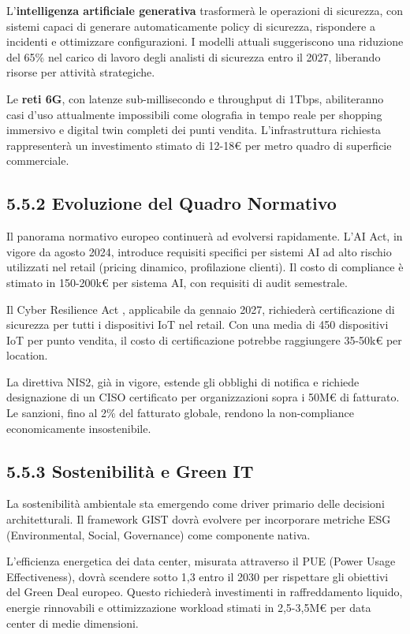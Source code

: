 L'\textbf{intelligenza artificiale generativa} trasformerà le operazioni di sicurezza, con sistemi capaci di generare automaticamente policy di sicurezza, rispondere a incidenti e ottimizzare configurazioni. I modelli attuali suggeriscono una riduzione del 65\% nel carico di lavoro degli analisti di sicurezza entro il 2027, liberando risorse per attività strategiche.

Le \textbf{reti 6G}, con latenze sub-millisecondo e throughput di 1Tbps, abiliteranno casi d'uso attualmente impossibili come olografia in tempo reale per shopping immersivo e digital twin completi dei punti vendita. L'infrastruttura richiesta rappresenterà un investimento stimato di 12-18€ per metro quadro di superficie commerciale.

\subsection{5.5.2 Evoluzione del Quadro Normativo}

Il panorama normativo europeo continuerà ad evolversi rapidamente. L'AI Act, in vigore da agosto 2024, introduce requisiti specifici per sistemi AI ad alto rischio utilizzati nel retail (pricing dinamico, profilazione clienti). Il costo di compliance è stimato in 150-200k€ per sistema AI, con requisiti di audit semestrale.

Il Cyber Resilience Act \autocite{ec2024digital}, applicabile da gennaio 2027, richiederà certificazione di sicurezza per tutti i dispositivi IoT nel retail. Con una media di 450 dispositivi IoT per punto vendita, il costo di certificazione potrebbe raggiungere 35-50k€ per location.

La direttiva NIS2, già in vigore, estende gli obblighi di notifica e richiede designazione di un CISO certificato per organizzazioni sopra i 50M€ di fatturato. Le sanzioni, fino al 2\% del fatturato globale, rendono la non-compliance economicamente insostenibile.

\subsection{5.5.3 Sostenibilità e Green IT}

La sostenibilità ambientale sta emergendo come driver primario delle decisioni architetturali. Il framework GIST dovrà evolvere per incorporare metriche ESG (Environmental, Social, Governance) come componente nativa.

L'efficienza energetica dei data center, misurata attraverso il PUE (Power Usage Effectiveness), dovrà scendere sotto 1,3 entro il 2030 per rispettare gli obiettivi del Green Deal europeo. Questo richiederà investimenti in raffreddamento liquido, energie rinnovabili e ottimizzazione workload stimati in 2,5-3,5M€ per data center di medie dimensioni.

